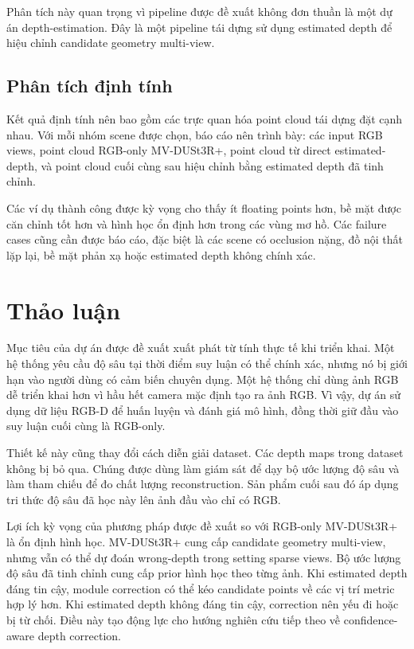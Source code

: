 \documentclass[12pt,a4paper]{article}
\newcommand{\mvdp}{MV-DUSt3R+}
\begin{document}
Phân tích này quan trọng vì pipeline được đề xuất không đơn thuần là một dự án depth-estimation. Đây là một pipeline tái dựng sử dụng estimated depth để hiệu chỉnh candidate geometry multi-view.

\subsection{Phân tích định tính}
Kết quả định tính nên bao gồm các trực quan hóa point cloud tái dựng đặt cạnh nhau. Với mỗi nhóm scene được chọn, báo cáo nên trình bày: các input RGB views, point cloud RGB-only \mvdp{}, point cloud từ direct estimated-depth, và point cloud cuối cùng sau hiệu chỉnh bằng estimated depth đã tinh chỉnh.

Các ví dụ thành công được kỳ vọng cho thấy ít floating points hơn, bề mặt được căn chỉnh tốt hơn và hình học ổn định hơn trong các vùng mơ hồ. Các failure cases cũng cần được báo cáo, đặc biệt là các scene có occlusion nặng, đồ nội thất lặp lại, bề mặt phản xạ hoặc estimated depth không chính xác.

\section{Thảo luận}
Mục tiêu của dự án được đề xuất xuất phát từ tính thực tế khi triển khai. Một hệ thống yêu cầu độ sâu tại thời điểm suy luận có thể chính xác, nhưng nó bị giới hạn vào người dùng có cảm biến chuyên dụng. Một hệ thống chỉ dùng ảnh RGB dễ triển khai hơn vì hầu hết camera mặc định tạo ra ảnh RGB. Vì vậy, dự án sử dụng dữ liệu RGB-D để huấn luyện và đánh giá mô hình, đồng thời giữ đầu vào suy luận cuối cùng là RGB-only.

Thiết kế này cũng thay đổi cách diễn giải dataset. Các depth maps trong dataset không bị bỏ qua. Chúng được dùng làm giám sát để dạy bộ ước lượng độ sâu và làm tham chiếu để đo chất lượng reconstruction. Sản phẩm cuối sau đó áp dụng tri thức độ sâu đã học này lên ảnh đầu vào chỉ có RGB.

Lợi ích kỳ vọng của phương pháp được đề xuất so với RGB-only \mvdp{} là ổn định hình học. \mvdp{} cung cấp candidate geometry multi-view, nhưng vẫn có thể dự đoán wrong-depth trong setting sparse views. Bộ ước lượng độ sâu đã tinh chỉnh cung cấp prior hình học theo từng ảnh. Khi estimated depth đáng tin cậy, module correction có thể kéo candidate points về các vị trí metric hợp lý hơn. Khi estimated depth không đáng tin cậy, correction nên yếu đi hoặc bị từ chối. Điều này tạo động lực cho hướng nghiên cứu tiếp theo về confidence-aware depth correction.
\end{document}

